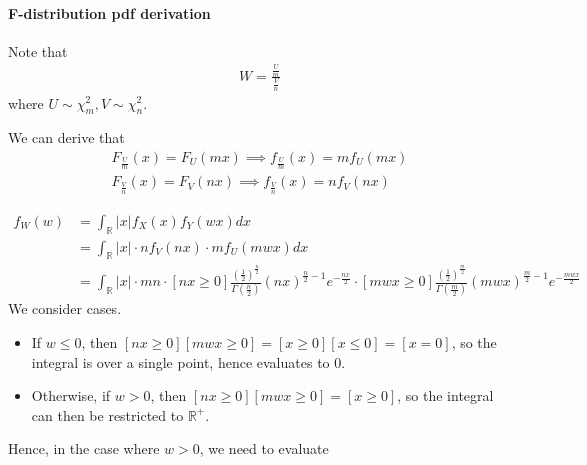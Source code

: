 \documentclass[a4paper]{article}
\newcommand{\rbracket}[1]{\left(#1\right)}
\newcommand{\real}[0]{\mathbb{R}} %
\begin{document}
\paragraph{F-distribution pdf derivation}
Note that
\begin{align*}
	W = \frac{\frac{U}{m}}{\frac{V}{n}}
\end{align*}
where $U\sim \chi_m^2, V\sim \chi_n^2$.

We can derive that
\begin{align*}
	F_{\frac{U}{m}}(x)=F_U(mx)\implies f_{\frac{U}{m}}(x) = mf_U(mx)\\
	F_{\frac{V}{n}}(x)=F_V(nx)\implies f_{\frac{V}{n}}(x) = nf_V(nx)
\end{align*}

\begin{align*}
	f_W(w) &= \int_\real |x|f_X(x)f_Y(wx)dx\\
	&= \int_\real |x|\cdot nf_V(nx)\cdot mf_U(mwx)dx\\
	&= \int_\real |x|\cdot mn\cdot [nx\geq 0]\frac{\rbracket{\frac{1}{2}}^{\frac{n}{2}}}{\Gamma\rbracket{\frac{n}{2}}}(nx)^{\frac{n}{2}-1}e^{-\frac{nx}{2}}\cdot [mwx\geq 0]\frac{\rbracket{\frac{1}{2}}^{\frac{m}{2}}}{\Gamma\rbracket{\frac{m}{2}}}(mwx)^{\frac{m}{2}-1}e^{-\frac{mwx}{2}}
\end{align*}
We consider cases. 
\begin{itemize}
	\item If $w\leq 0$, then $[nx\geq 0][mwx\geq 0] = [x\geq 0][x\leq 0] = [x=0]$, so the integral is over a single point, hence evaluates to $0$.
	\item Otherwise, if $w>0$, then $[nx\geq 0][mwx\geq 0] = [x\geq 0]$, so the integral can then be restricted to $\mathbb{R}^+$.
\end{itemize}
Hence, in the case where $w > 0$, we need to evaluate
\end{document}
